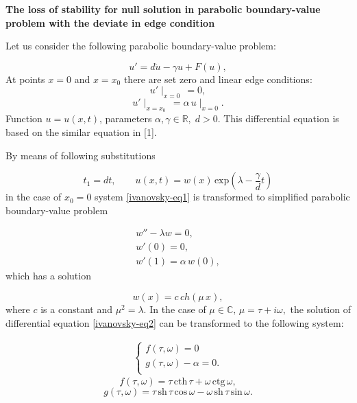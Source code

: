\documentclass{article}
\begin{document}
\begin{center}
\textbf{ The loss of stability for null solution in parabolic boundary-value problem with the deviate in edge condition }
\end{center}

Let us consider the following parabolic boundary-value problem:

\begin{equation}\label{ivanovsky-eq1}
	u' = d \ddot{u} - \gamma u + F(u),
\end{equation}
At points $ x = 0 $ and $ x = x_0 $ there are set zero and linear edge conditions: 
$$  u'\mid_{x=0} \, = 0, $$
$$ u'\mid_{x=x_0} \, = \alpha\,u\mid_{x=0}. $$ 
Function $ u = u(x, t) $, parameters  $ \alpha, \gamma \in \mathbb{R}, \; d > 0 $. This differential equation is based on the similar equation in [1].

By means of following substitutions

$$ t_1 = dt, \qquad u(x, t) = w(x)\,\mbox{exp}\left( \lambda - \frac{\gamma}{d}t \right) $$ 
in the case of $ x_0 = 0 $ system \eqref{ivanovsky-eq1} is transformed to simplified parabolic boundary-value problem

\begin{equation}\label{ivanovsky-eq2}
\begin{array}{l}
	w'' - \lambda w = 0, \\
	w'(0) = 0, \\
	w'(1) = \alpha\,w(0),
\end{array}
\end{equation}
which has a solution

$$ w(x) = c\,ch(\mu\, x), $$
where $ c $ is a constant and $ \mu^2 = \lambda $. In the case of $ \mu \in \mathbb{C}, \, \mu = \tau + i \omega, $ the solution of differential equation \eqref{ivanovsky-eq2} can be transformed to the following system:

\begin{equation}\label{ivanovsky-eq3}
\begin{array}{l}
\begin{cases}
f(\tau, \omega) = 0 \\
g(\tau, \omega) - \alpha = 0. \\
\end{cases}
\end{array}
\end{equation}
$$ f(\tau, \omega) = \tau\,\mbox{cth}\,\tau + \omega\,\mbox{ctg}\,\omega, $$
$$ g(\tau, \omega) = \tau\,\mbox{sh}\,\tau\,\mbox{cos}\,\omega - \omega\,\mbox{sh}\,\tau\,\mbox{sin}\,\omega. $$
\end{document}
